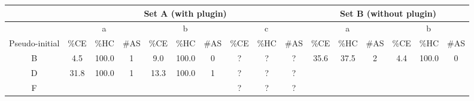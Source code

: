 \begin{landscape}
  \begin{table}[p]
    \begin{tabular}{@{}cccccccccccccccc@{}}
      \toprule
      \multicolumn{1}{l}{}       & \multicolumn{9}{c}{Set A (with plugin)}                                                                                                                                                 & \multicolumn{6}{c}{Set B (without plugin)}                                                                                                  \\ \midrule
                                 & \multicolumn{3}{c}{a} & \multicolumn{3}{c}{b}                                                          & \multicolumn{3}{c}{c}                                                          & \multicolumn{3}{c}{a}                                      & \multicolumn{3}{c}{b}                                                          \\ \midrule
      Pseudo-initial             & \%CE  & \%HC  & \#AS  & \multicolumn{1}{l}{\%CE} & \multicolumn{1}{l}{\%HC} & \multicolumn{1}{l}{\#AS} & \multicolumn{1}{l}{\%CE} & \multicolumn{1}{l}{\%HC} & \multicolumn{1}{l}{\#AS} & \%CE & \multicolumn{1}{l}{\%HC} & \multicolumn{1}{l}{\#AS} & \multicolumn{1}{l}{\%CE} & \multicolumn{1}{l}{\%HC} & \multicolumn{1}{l}{\#AS} \\ \midrule
      B                          & 4.5   & 100.0 & 1     & 9.0                      & 100.0                    & 0                        & ?                        & ?                        & ?                        & 35.6 & 37.5                     & 2                        & 4.4                      & 100.0                    & 0                        \\
      D                          & 31.8  & 100.0 & 1     & 13.3                     & 100.0                    & 1                        & ?                        & ?                        & ?                        &      &                          &                          &                          &                          &                          \\
      F                          &       &       &       &                          &                          &                          & ?                        & ?                        & ?                        &      &                          &                          &                          &                          &                          \\

\end{tabular}
\end{table}
\end{landscape}
